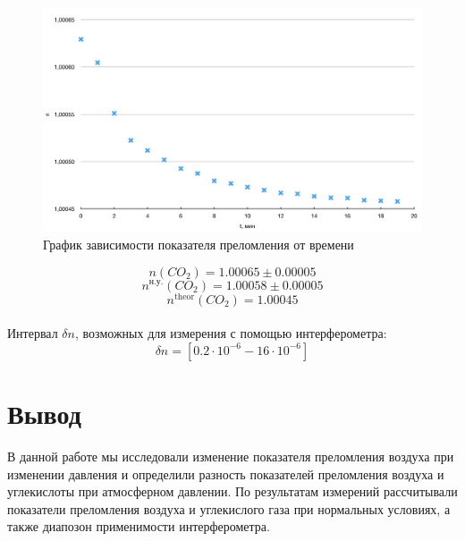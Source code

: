 \documentclass[a4paper, 12pt]{article}
\begin{document}
\begin{figure}[H]
	\centering
	\includegraphics[width = 16 cm]{4.png}
	\caption{График зависимости показателя преломления от времени}
\end{figure}

\[n(CO_2) = 1.00065\pm0.00005\]
\[n^{\text{н.у.}}(CO_2) = 1.00058\pm0.00005\]
\[n^{\text{theor}}(CO_2) = 1.00045\]
\\
\noindent Интервал $\delta n$, возможных для измерения с помощью интерферометра:
\[\delta n = [0.2\cdot 10^{-6} - 16 \cdot 10^{-6}] \]


\section*{Вывод}  
	\noindent В данной работе мы исследовали изменение показателя преломления воздуха при изменении давления и определили разность показателей преломления воздуха и углекислоты при атмосферном давлении. По результатам измерений рассчитывали показатели преломления воздуха и углекислого газа при нормальных условиях, а также диапозон применимости интерферометра. 
\end{document}
